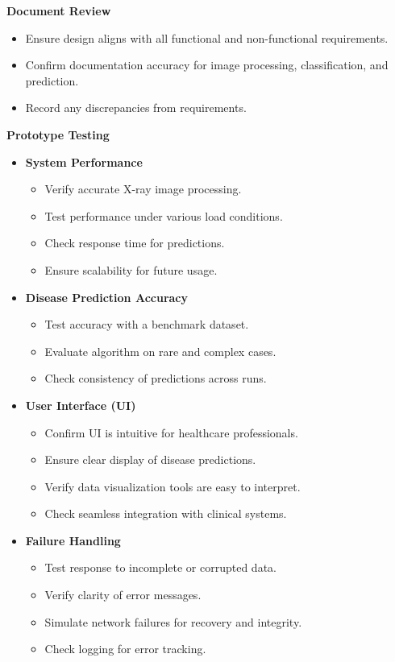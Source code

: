 \documentclass[12pt, titlepage]{article}
\begin{document}
\textbf{Document Review}
    \begin{itemize}
        \item Ensure design aligns with all functional and non-functional requirements.
        \item Confirm documentation accuracy for image processing, classification, and prediction.
        \item Record any discrepancies from requirements.
    \end{itemize}
\textbf{Prototype Testing}
\begin{itemize}
    \item \textbf{System Performance}
    \begin{itemize}
        \item Verify accurate X-ray image processing.
        \item Test performance under various load conditions.
        \item Check response time for predictions.
        \item Ensure scalability for future usage.
    \end{itemize}

\item \textbf{Disease Prediction Accuracy}
    \begin{itemize}
        \item Test accuracy with a benchmark dataset.
        \item Evaluate algorithm on rare and complex cases.
        \item Check consistency of predictions across runs.
    \end{itemize}

    \item \textbf{User Interface (UI)}
    \begin{itemize}
        \item Confirm UI is intuitive for healthcare professionals.
        \item Ensure clear display of disease predictions.
        \item Verify data visualization tools are easy to interpret.
        \item Check seamless integration with clinical systems.
    \end{itemize}

    \item \textbf{Failure Handling}
    \begin{itemize}
        \item Test response to incomplete or corrupted data.
        \item Verify clarity of error messages.
        \item Simulate network failures for recovery and integrity.
        \item Check logging for error tracking.
    \end{itemize}


\end{itemize}
\end{document}
